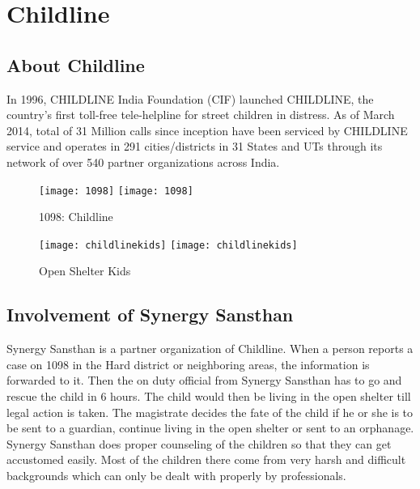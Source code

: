 \chapter{Childline}
\ifpdf
    \graphicspath{{Chapter2/Chapter2Figs/PNG/}{Chapter2/Chapter2Figs/PDF/}{Chapter2/Chapter2Figs/}}
\else
    \graphicspath{{Chapter2/Chapter2Figs/EPS/}{Chapter2/Chapter2Figs/}}
\fi

\section{About Childline}
In 1996, CHILDLINE India Foundation (CIF) launched CHILDLINE, the country's first toll-free tele-helpline for street children in distress. As of March 2014, total of 31 Million calls since inception have been serviced by CHILDLINE service and operates in 291 cities/districts in 31 States and UTs through its network of over 540 partner organizations across India.

\begin{figure}[ht!]
  \begin{center}
    \leavevmode
    \ifpdf
      \texttt{[image: 1098]}
    \else
      \texttt{[image: 1098]}
    \fi
    \caption{1098: Childline}
    \label{FigAir}
  \end{center}
\end{figure}



\begin{figure}
  \begin{center}
    \leavevmode
    \ifpdf
      \texttt{[image: childlinekids]}
    \else
      \texttt{[image: childlinekids]}
    \fi
    \caption{Open Shelter Kids}
    \label{FigAir}
  \end{center}
\end{figure}

\section{Involvement of Synergy Sansthan}
Synergy Sansthan is a partner organization of Childline. When a person reports a case on 1098 in the Hard district or neighboring areas, the information is forwarded to it. Then the on duty official from Synergy Sansthan has to go and rescue the child in 6 hours. The child would then be living in the open shelter till legal action is taken. The magistrate decides the fate of the child if he or she is to be sent to a guardian, continue living in the open shelter or sent to an orphanage. Synergy Sansthan does proper counseling of the children so that they can get accustomed easily. Most of the children there come from very harsh and difficult backgrounds which can only be dealt with properly by professionals.



